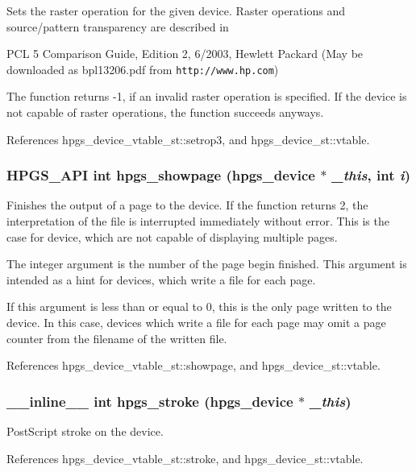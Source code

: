 Sets the raster operation for the given device. Raster operations and source/pattern transparency are described in

PCL 5 Comparison Guide, Edition 2, 6/2003, Hewlett Packard (May be downloaded as bpl13206.pdf from {\tt http://www.hp.com})

The function returns -1, if an invalid raster operation is specified. If the device is not capable of raster operations, the function succeeds anyways. 

References hpgs\_\-device\_\-vtable\_\-st::setrop3, and hpgs\_\-device\_\-st::vtable.
\subsubsection[hpgs\_\-showpage]{\setlength{\rightskip}{0pt plus 5cm}HPGS\_\-API int hpgs\_\-showpage ({\bf hpgs\_\-device} $\ast$ {\em \_\-this}, \/  int {\em i})}\label{group__device_gb5845cf069a5d4ca79dfd845e44a0534}


Finishes the output of a page to the device. If the function returns 2, the interpretation of the file is interrupted immediately without error. This is the case for device, which are not capable of displaying multiple pages.

The integer argument is the number of the page begin finished. This argument is intended as a hint for devices, which write a file for each page.

If this argument is less than or equal to 0, this is the only page written to the device. In this case, devices which write a file for each page may omit a page counter from the filename of the written file. 

References hpgs\_\-device\_\-vtable\_\-st::showpage, and hpgs\_\-device\_\-st::vtable.
\subsubsection[hpgs\_\-stroke]{\setlength{\rightskip}{0pt plus 5cm}\_\-\_\-inline\_\-\_\- int hpgs\_\-stroke ({\bf hpgs\_\-device} $\ast$ {\em \_\-this})\hspace{0.3cm}{\tt  [static]}}\label{group__device_g446e8ce0815e9a34c92b87c76c9e1236}


PostScript stroke on the device. 

References hpgs\_\-device\_\-vtable\_\-st::stroke, and hpgs\_\-device\_\-st::vtable.